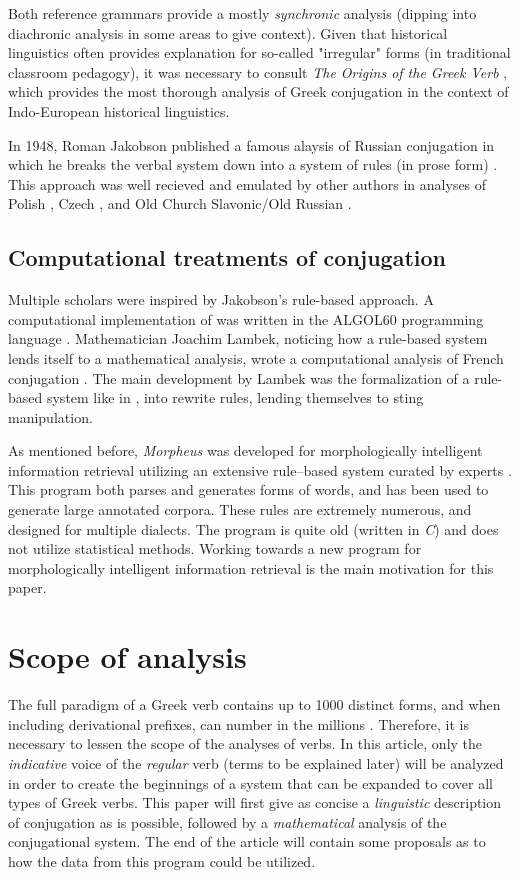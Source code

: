 \documentclass[12pt]{article}
\begin{document}
Both reference grammars provide a mostly \textit{synchronic} analysis (dipping
into diachronic analysis in some areas to give context). Given that historical
linguistics often provides explanation for so-called "irregular" forms (in
traditional classroom pedagogy), it was necessary to consult \textit{The
Origins of the Greek Verb} \citep{willi2018}, which provides the most thorough
analysis of Greek conjugation in the context of Indo-European historical
linguistics.

In 1948, Roman Jakobson published a famous alaysis of Russian conjugation in
which he breaks the verbal system down into a system of rules (in prose form)
\citep{jakobson48}. This approach was well recieved and emulated by other
authors in analyses of Polish \citep{schenker1954}, Czech
\citep{rubenstein1951}, and Old Church Slavonic/Old Russian \cite{halle1951}.

\subsection{Computational treatments of conjugation}

Multiple scholars were inspired by Jakobson's rule-based approach. A
computational implementation of \citet{jakobson48} was written in the ALGOL60
programming language \citep{kortlant1971}. Mathematician Joachim Lambek,
noticing how a rule-based system lends itself to a mathematical analysis, wrote
a computational analysis of French conjugation \citep{lambek75}. The main 
development by Lambek was the formalization of a rule-based system like in
\citet{jakobson48}, into rewrite rules, lending themselves to sting manipulation.

As mentioned before, \textit{Morpheus} was developed for morphologically
intelligent information retrieval utilizing an extensive rule--based system
curated by experts \citep{crane91}. This program both parses and generates
forms of words, and has been used to generate large annotated corpora. These
rules are extremely numerous, and designed for multiple dialects.  The program
is quite old (written in \textit{C}) and does not utilize statistical methods.
Working towards a new program for morphologically intelligent information
retrieval is the main motivation for this paper.

\section{Scope of analysis}

The full paradigm of a Greek verb contains up to 1000 distinct forms, and when
including derivational prefixes, can number in the millions \citep{crane91}.
Therefore, it is necessary to lessen the scope of the analyses of verbs. In
this article, only the \textit{indicative} voice of the \textit{regular} verb
(terms to be explained later) will be analyzed in order to create the
beginnings of a system that can be expanded to cover all types of Greek verbs.
This paper will first give as concise a \textit{linguistic} description of
conjugation as is possible, followed by a \textit{mathematical} analysis of the
conjugational system. The end of the article will contain some proposals as to
how the data from this program could be utilized.
\end{document}
